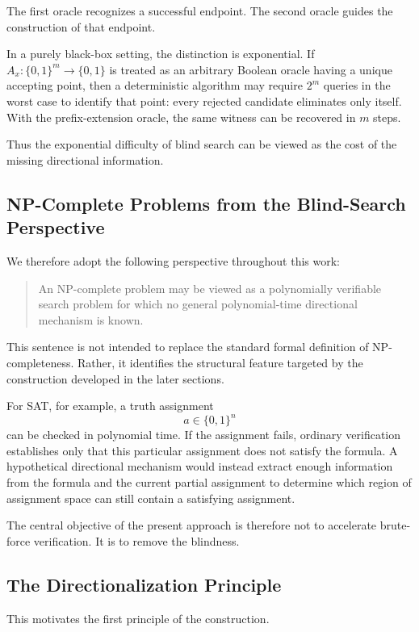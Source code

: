 \documentclass[11pt]{article}
\theoremstyle{plain}
\theoremstyle{definition}
\begin{document}
The first oracle recognizes a successful endpoint.  The second oracle guides
the construction of that endpoint.

In a purely black-box setting, the distinction is exponential.  If
\(A_x:\{0,1\}^{m}\to\{0,1\}\) is treated as an arbitrary Boolean oracle having
a unique accepting point, then a deterministic algorithm may require
\(2^{m}\) queries in the worst case to identify that point: every rejected
candidate eliminates only itself.  With the prefix-extension oracle, the same
witness can be recovered in \(m\) steps.

Thus the exponential difficulty of blind search can be viewed as the cost of
the missing directional information.

\subsection{NP-Complete Problems from the Blind-Search Perspective}

We therefore adopt the following perspective throughout this work:

\begin{quote}
An NP-complete problem may be viewed as a polynomially verifiable search
problem for which no general polynomial-time directional mechanism is known.
\end{quote}

This sentence is not intended to replace the standard formal definition of
NP-completeness.  Rather, it identifies the structural feature targeted by
the construction developed in the later sections.

For SAT, for example, a truth assignment
\[
    a\in\{0,1\}^{n}
\]
can be checked in polynomial time.  If the assignment fails, ordinary
verification establishes only that this particular assignment does not
satisfy the formula.  A hypothetical directional mechanism would instead
extract enough information from the formula and the current partial
assignment to determine which region of assignment space can still contain a
satisfying assignment.

The central objective of the present approach is therefore not to accelerate
brute-force verification.  It is to remove the blindness.

\subsection{The Directionalization Principle}

This motivates the first principle of the construction.
\end{document}
